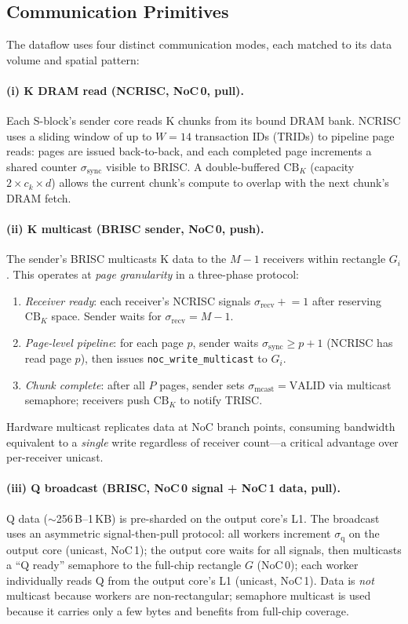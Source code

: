 \documentclass[sigconf, review, anonymous]{acmart}
\newcommand{\SblockName}{S-block}
\begin{document}
\subsection{Communication Primitives}\label{sec:design-comm}

The dataflow uses four distinct communication modes, each matched to
its data volume and spatial pattern:

\paragraph{(i) K DRAM read (NCRISC, NoC\,0, pull).}
Each \SblockName{}'s sender core reads K chunks from its bound DRAM bank.
NCRISC uses a sliding window of up to $W{=}14$ transaction IDs
(TRIDs) to pipeline page reads: pages are issued back-to-back, and
each completed page increments a shared counter $\sigma_{\mathrm{sync}}$
visible to BRISC.  A double-buffered $\mathrm{CB}_K$ (capacity
$2 \times c_k \times d$) allows the current chunk's compute to
overlap with the next chunk's DRAM fetch.

\paragraph{(ii) K multicast (BRISC sender, NoC\,0, push).}
The sender's BRISC multicasts K data to the $M{-}1$ receivers within
rectangle $G_i$.  This operates at \emph{page granularity} in a
three-phase protocol:
\begin{enumerate}
  \item \emph{Receiver ready}: each receiver's NCRISC signals
    $\sigma_{\mathrm{recv}} \mathrel{+}= 1$ after reserving
    $\mathrm{CB}_K$ space. Sender waits for $\sigma_{\mathrm{recv}} = M{-}1$.
  \item \emph{Page-level pipeline}: for each page $p$, sender waits
    $\sigma_{\mathrm{sync}} \geq p{+}1$ (NCRISC has read page $p$),
    then issues \texttt{noc\_write\_multicast} to $G_i$.
  \item \emph{Chunk complete}: after all $P$ pages, sender sets
    $\sigma_{\mathrm{mcast}} = \mathrm{VALID}$ via multicast semaphore;
    receivers push $\mathrm{CB}_K$ to notify TRISC.
\end{enumerate}
Hardware multicast replicates data at NoC branch points, consuming
bandwidth equivalent to a \emph{single} write regardless of receiver
count---a critical advantage over per-receiver unicast.

\paragraph{(iii) Q broadcast (BRISC, NoC\,0 signal + NoC\,1 data, pull).}
Q data (${\sim}$256\,B--1\,KB) is pre-sharded on the output core's
L1.  The broadcast uses an asymmetric signal-then-pull protocol:
all workers increment $\sigma_{\mathrm{q}}$ on the output core
(unicast, NoC\,1); the output core waits for all signals, then
multicasts a ``Q ready'' semaphore to the full-chip rectangle $G$
(NoC\,0); each worker individually reads Q from the output core's L1
(unicast, NoC\,1).  Data is \emph{not} multicast because workers are
non-rectangular; semaphore multicast is used because it carries only a
few bytes and benefits from full-chip coverage.
\end{document}
